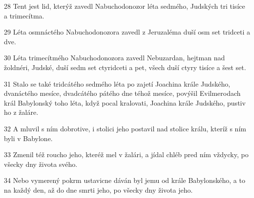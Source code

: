 \par 28 Tent jest lid, kterýž zavedl Nabuchodonozor léta sedmého, Judských tri tisíce a trimecítma.
\par 29 Léta osmnáctého Nabuchodonozora zavedl z Jeruzaléma duší osm set tridceti a dve.
\par 30 Léta trimecítmého Nabuchodonozora zavedl Nebuzardan, hejtman nad žoldnéri, Judské, duší sedm set ctyridceti a pet, všech duší ctyry tisíce a šest set.
\par 31 Stalo se také tridcátého sedmého léta po zajetí Joachina krále Judského, dvanáctého mesíce, dvadcátého pátého dne téhož mesíce, povýšil Evilmerodach král Babylonský toho léta, když pocal kralovati, Joachina krále Judského, pustiv ho z žaláre.
\par 32 A mluvil s ním dobrotive, i stolici jeho postavil nad stolice králu, kteríž s ním byli v Babylone.
\par 33 Zmenil též roucho jeho, kteréž mel v žalári, a jídal chléb pred ním vždycky, po všecky dny života svého.
\par 34 Nebo vymerený pokrm ustavicne dáván byl jemu od krále Babylonského, a to na každý den, až do dne smrti jeho, po všecky dny života jeho.

